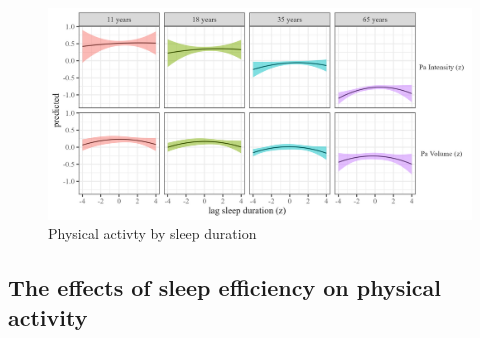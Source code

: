 \documentclass[
  man]{apa6}
\begin{document}
\begin{figure}
\includegraphics[width=7.08in]{../Figures/Pa on sleep_duration_lag} \caption{Physical activty by sleep duration}\label{fig:PA-by-sleep-duration-fig}
\end{figure}

\hypertarget{the-effects-of-sleep-efficiency-on-physical-activity}{%
\subsection{The effects of sleep efficiency on physical activity}\label{the-effects-of-sleep-efficiency-on-physical-activity}}
\end{document}
